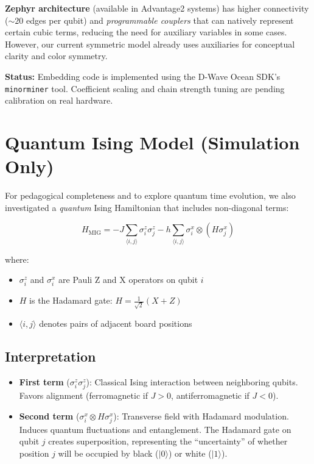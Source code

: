 \documentclass[aps,prl,reprint]{revtex4-2}
\begin{document}
\textbf{Zephyr architecture} (available in Advantage2 systems) has higher connectivity ($\sim 20$ edges per qubit) and \textit{programmable couplers} that can natively represent certain cubic terms, reducing the need for auxiliary variables in some cases. However, our current symmetric model already uses auxiliaries for conceptual clarity and color symmetry.

\textbf{Status:} Embedding code is implemented using the D-Wave Ocean SDK's \texttt{minorminer} tool. Coefficient scaling and chain strength tuning are pending calibration on real hardware.

\section{Quantum Ising Model (Simulation Only)}
\label{sec:quantum_ising}

For pedagogical completeness and to explore quantum time evolution, we also investigated a \textit{quantum} Ising Hamiltonian that includes non-diagonal terms:

\begin{equation}
H_{\text{MIG}} = -J \sum_{\langle i,j \rangle} \sigma^z_i \sigma^z_j - h \sum_{\langle i,j \rangle} \sigma^x_i \otimes (H \sigma^x_j)
\label{eq:quantum_hamiltonian}
\end{equation}

where:
\begin{itemize}
	\item $\sigma^z_i$ and $\sigma^x_i$ are Pauli Z and X operators on qubit $i$
	\item $H$ is the Hadamard gate: $H = \frac{1}{\sqrt{2}}(X + Z)$
	\item $\langle i,j \rangle$ denotes pairs of adjacent board positions
\end{itemize}

\subsection{Interpretation}

\begin{itemize}
	\item \textbf{First term} ($\sigma^z_i \sigma^z_j$): Classical Ising interaction between neighboring qubits. Favors alignment (ferromagnetic if $J > 0$, antiferromagnetic if $J < 0$).
	
	\item \textbf{Second term} ($\sigma^x_i \otimes H\sigma^x_j$): Transverse field with Hadamard modulation. Induces quantum fluctuations and entanglement. The Hadamard gate on qubit $j$ creates superposition, representing the ``uncertainty'' of whether position $j$ will be occupied by black ($|0\rangle$) or white ($|1\rangle$).
\end{itemize}
\end{document}
